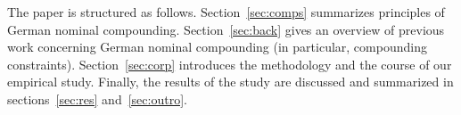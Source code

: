 \documentclass[10pt, a4paper]{article}
\begin{document}
The paper is structured as follows. Section~\ref{sec:comps} summarizes principles of German nominal compounding. Section~\ref{sec:back} gives an overview of previous work concerning German nominal compounding (in particular, compounding constraints). Section~\ref{sec:corp} introduces the methodology and the course of our empirical study. Finally, the results of the study are discussed and summarized in sections~\ref{sec:res} and~\ref{sec:outro}.





    
    
    
    
    

    
    
    
    

    
\end{document}
